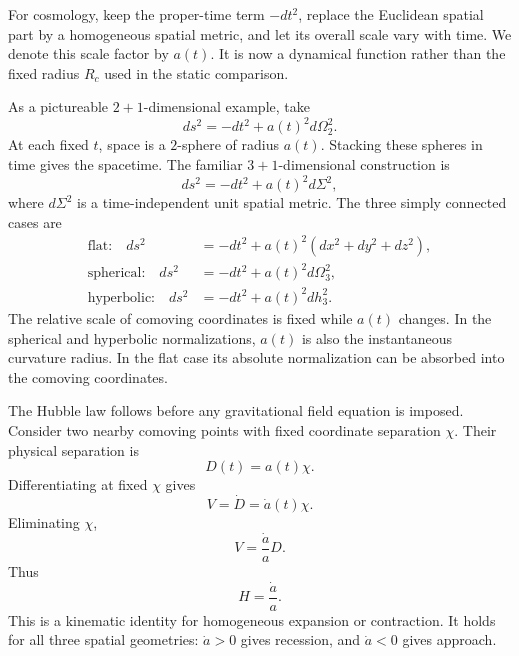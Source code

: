For cosmology, keep the proper-time term \(-dt^2\), replace the Euclidean spatial part by a homogeneous spatial metric, and let its overall scale vary with time. We denote this scale factor by \(a(t)\). It is now a dynamical function rather than the fixed radius \(R_c\) used in the static comparison.

As a pictureable \(2+1\)-dimensional example, take
\begin{equation}
ds^2 = -dt^2 + a(t)^2 d\Omega_2^2.
\label{eq:c03-two-plus-one}
\end{equation}
At each fixed \(t\), space is a \(2\)-sphere of radius \(a(t)\). Stacking these spheres in time gives the spacetime. The familiar \(3+1\)-dimensional construction is
\begin{equation}
ds^2 = -dt^2 + a(t)^2 d\Sigma^2,
\label{eq:c03-frw-general}
\end{equation}
where \(d\Sigma^2\) is a time-independent unit spatial metric. The three simply connected cases are
\begin{align}
\text{flat:}\quad
ds^2&=-dt^2+a(t)^2\left(dx^2+dy^2+dz^2\right),\label{eq:c03-frw-flat}\\
\text{spherical:}\quad
ds^2&=-dt^2+a(t)^2d\Omega_3^2,\label{eq:c03-frw-spherical}\\
\text{hyperbolic:}\quad
ds^2&=-dt^2+a(t)^2dh_3^2.\label{eq:c03-frw-hyperbolic}
\end{align}
The relative scale of comoving coordinates is fixed while \(a(t)\) changes. In the spherical and hyperbolic normalizations, \(a(t)\) is also the instantaneous curvature radius. In the flat case its absolute normalization can be absorbed into the comoving coordinates.

The Hubble law follows before any gravitational field equation is imposed. Consider two nearby comoving points with fixed coordinate separation \(\chi\). Their physical separation is
\begin{equation}
D(t)=a(t)\chi.
\label{eq:c03-comoving-distance}
\end{equation}
Differentiating at fixed \(\chi\) gives
\begin{equation}
V=\dot D=\dot a(t)\chi.
\end{equation}
Eliminating \(\chi\),
\begin{equation}
V = \frac{\dot a}{a} D.
\label{eq:c03-hubble-law}
\end{equation}
Thus
\begin{equation}
H = \frac{\dot a}{a}.
\label{eq:c03-hubble-parameter}
\end{equation}
This is a kinematic identity for homogeneous expansion or contraction. It holds for all three spatial geometries: \(\dot a>0\) gives recession, and \(\dot a<0\) gives approach.

